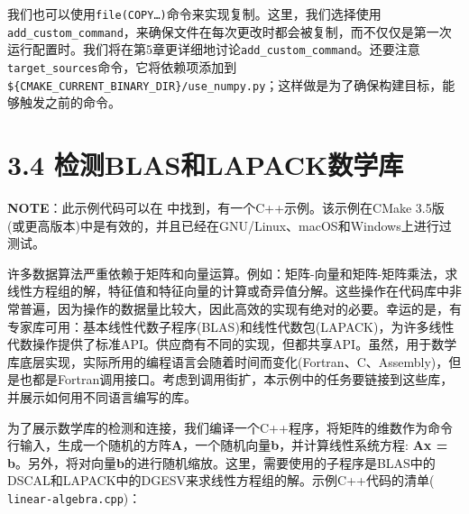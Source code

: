 我们也可以使用\texttt{file(COPY…)}命令来实现复制。这里，我们选择使用\texttt{add\_custom\_command}，来确保文件在每次更改时都会被复制，而不仅仅是第一次运行配置时。我们将在第5章更详细地讨论\texttt{add\_custom\_command}。还要注意\texttt{target\_sources}命令，它将依赖项添加到\texttt{\$\{CMAKE\_CURRENT\_BINARY\_DIR\}/use\_numpy.py}；这样做是为了确保构建目标，能够触发之前的命令。


\section{3.4 检测BLAS和LAPACK数学库}

\begin{myInfoBox}
\textbf{NOTE}：此示例代码可以在  中找到，有一个C++示例。该示例在CMake 3.5版(或更高版本)中是有效的，并且已经在GNU/Linux、macOS和Windows上进行过测试。
\end{myInfoBox}

许多数据算法严重依赖于矩阵和向量运算。例如：矩阵-向量和矩阵-矩阵乘法，求线性方程组的解，特征值和特征向量的计算或奇异值分解。这些操作在代码库中非常普遍，因为操作的数据量比较大，因此高效的实现有绝对的必要。幸运的是，有专家库可用：基本线性代数子程序(BLAS)和线性代数包(LAPACK)，为许多线性代数操作提供了标准API。供应商有不同的实现，但都共享API。虽然，用于数学库底层实现，实际所用的编程语言会随着时间而变化(Fortran、C、Assembly)，但是也都是Fortran调用接口。考虑到调用街扩，本示例中的任务要链接到这些库，并展示如何用不同语言编写的库。


为了展示数学库的检测和连接，我们编译一个C++程序，将矩阵的维数作为命令行输入，生成一个随机的方阵\textbf{A}，一个随机向量\textbf{b}，并计算线性系统方程: \textbf{Ax = b}。另外，将对向量\textbf{b}的进行随机缩放。这里，需要使用的子程序是BLAS中的DSCAL和LAPACK中的DGESV来求线性方程组的解。示例C++代码的清单( \texttt{linear-algebra.cpp})：

